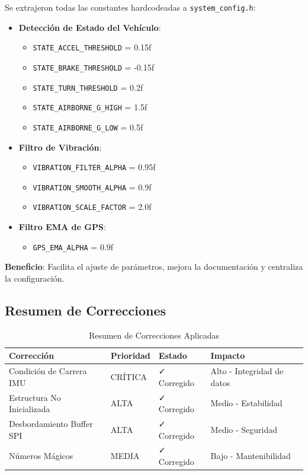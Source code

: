 \documentclass[11pt,a4paper]{article}
\begin{document}
Se extrajeron todas las constantes hardcodeadas a \texttt{system\_config.h}:

\begin{itemize}
    \item \textbf{Detección de Estado del Vehículo}:
    \begin{itemize}
        \item \texttt{STATE\_ACCEL\_THRESHOLD} = 0.15f
        \item \texttt{STATE\_BRAKE\_THRESHOLD} = -0.15f
        \item \texttt{STATE\_TURN\_THRESHOLD} = 0.2f
        \item \texttt{STATE\_AIRBORNE\_G\_HIGH} = 1.5f
        \item \texttt{STATE\_AIRBORNE\_G\_LOW} = 0.5f
    \end{itemize}
    
    \item \textbf{Filtro de Vibración}:
    \begin{itemize}
        \item \texttt{VIBRATION\_FILTER\_ALPHA} = 0.95f
        \item \texttt{VIBRATION\_SMOOTH\_ALPHA} = 0.9f
        \item \texttt{VIBRATION\_SCALE\_FACTOR} = 2.0f
    \end{itemize}
    
    \item \textbf{Filtro EMA de GPS}:
    \begin{itemize}
        \item \texttt{GPS\_EMA\_ALPHA} = 0.9f
    \end{itemize}
\end{itemize}

\textbf{Beneficio}: Facilita el ajuste de parámetros, mejora la documentación y centraliza la configuración.

\subsection{Resumen de Correcciones}

\begin{table}[H]
\centering
\begin{tabular}{@{}llll@{}}
\toprule
\textbf{Corrección} & \textbf{Prioridad} & \textbf{Estado} & \textbf{Impacto} \\
\midrule
Condición de Carrera IMU & CRÍTICA & ✓ Corregido & Alto - Integridad de datos \\
Estructura No Inicializada & ALTA & ✓ Corregido & Medio - Estabilidad \\
Desbordamiento Buffer SPI & ALTA & ✓ Corregido & Medio - Seguridad \\
Números Mágicos & MEDIA & ✓ Corregido & Bajo - Mantenibilidad \\
\bottomrule
\end{tabular}
\caption{Resumen de Correcciones Aplicadas}
\end{table}
\end{document}
